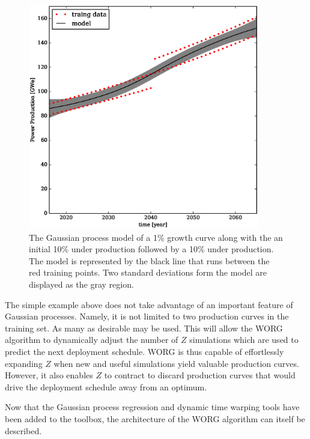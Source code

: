 \begin{figure}[htb]
\centering
\includegraphics[width=0.9\textwidth]{gwe-model-.eps}
\caption{The Gaussian process model of a 1\% growth curve along with the
an initial 10\% under production followed by a 10\% under production. 
The model is represented by the black line that runs between the red 
training points. Two standard deviations form the model are displayed as the
gray region.}
\label{gwe-model-}
\end{figure}

The simple example above does not take advantage of an important 
feature of Gaussian processes. Namely, it is not limited to two production
curves in the training set.  As many as desirable may be used.  This will
allow the WORG algorithm to dynamically adjust the number of $Z$ simulations 
which are used to predict the next deployment schedule. WORG is thus capable
of 
effortlessly expanding $Z$ when new and useful simulations yield valuable production
curves.  However, it also enables $Z$ to contract to discard production
curves that would drive the deployment schedule away from an optimum.

Now that the Gaussian process regression and dynamic time warping tools have 
been added to the toolbox, the architecture of the WORG algorithm can 
itself be described.

\clearpage
